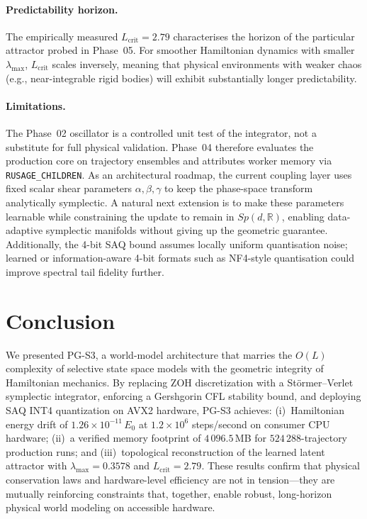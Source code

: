 \documentclass[10pt,twocolumn]{article}
\newcommand{\R}{\mathbb{R}}
\begin{document}
\paragraph{Predictability horizon.}
The empirically measured $L_{\text{crit}}=2.79$ characterises
the horizon of the particular attractor probed in Phase~05.
For smoother Hamiltonian dynamics with smaller $\lambda_{\max}$,
$L_{\text{crit}}$ scales inversely, meaning that physical
environments with weaker chaos (e.g., near-integrable rigid bodies)
will exhibit substantially longer predictability.

\paragraph{Limitations.}
The Phase~02 oscillator is a controlled unit test of the integrator, not a
substitute for full physical validation. Phase~04 therefore evaluates the
production core on trajectory ensembles and attributes worker memory via
\texttt{RUSAGE\_CHILDREN}.
As an architectural roadmap, the current coupling layer uses fixed scalar
shear parameters $\alpha,\beta,\gamma$ to keep the phase-space transform
analytically symplectic. A natural next extension is to make these parameters
learnable while constraining the update to remain in $Sp(d,\R)$, enabling
data-adaptive symplectic manifolds without giving up the geometric guarantee.
Additionally, the 4-bit SAQ bound assumes locally uniform
quantisation noise; learned or information-aware 4-bit formats such as
NF4-style quantisation \cite{dettmers2023qlora} could improve spectral
tail fidelity further.

\section{Conclusion}
\label{sec:conclusion}

We presented PG-S3, a world-model architecture that marries the
$O(L)$ complexity of selective state space models with the geometric
integrity of Hamiltonian mechanics.
By replacing ZOH discretization with a St\"{o}rmer--Verlet symplectic
integrator, enforcing a Gershgorin CFL stability bound, and deploying
SAQ INT4 quantization on AVX2 hardware, PG-S3 achieves:
(i)~Hamiltonian energy drift of $1.26\times10^{-11}\,E_0$
at $1.2\times10^6$ steps/second on consumer CPU hardware;
(ii)~a verified memory footprint of $4\,096.5$\,MB for
$524\,288$-trajectory production runs; and
(iii)~topological reconstruction of the learned latent attractor
with $\lambda_{\max}=0.3578$ and $L_{\text{crit}}=2.79$.
These results confirm that physical conservation laws and
hardware-level efficiency are not in tension---they are
mutually reinforcing constraints that, together, enable
robust, long-horizon physical world modeling on accessible hardware.



\end{document}
